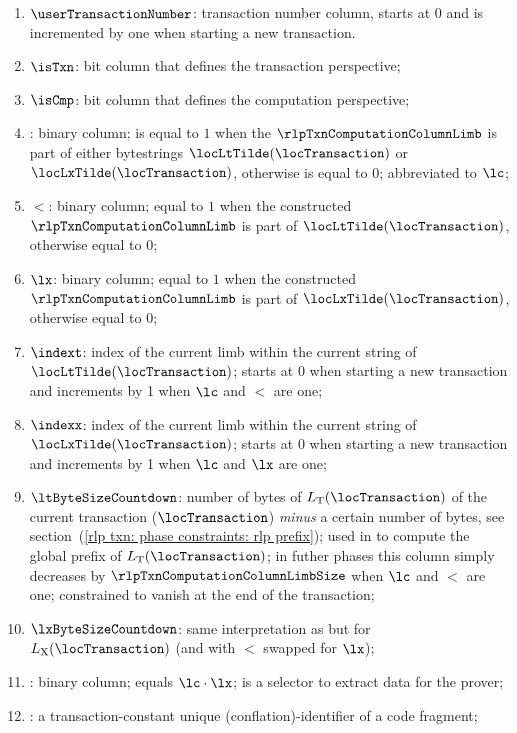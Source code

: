 \begin{enumerate}
    \item $\userTransactionNumber$:
	transaction number column, starts at 0 and is incremented by one when starting a new transaction.
    \item $\isTxn$:
	bit column that defines the transaction perspective;
    \item $\isCmp$:
	bit column that defines the computation perspective;
    \item {}:
	binary column;
	is equal to $1$ when the $\rlpTxnComputationColumnLimb$ is part of either \rlp{} bytestrings $\locLtTilde(\locTransaction)$ or $\locLxTilde(\locTransaction)$, otherwise is equal to $0$;
	abbreviated to $\lc$;
    \item $\lt$:
	binary column; equal to $1$ when the constructed $\rlpTxnComputationColumnLimb$ is part of $\locLtTilde(\locTransaction)$, otherwise equal to $0$;
    \item $\lx$:
	binary column; equal to $1$ when the constructed $\rlpTxnComputationColumnLimb$ is part of $\locLxTilde(\locTransaction)$, otherwise equal to $0$;
    \item $\indext$:
	index of the current limb within the current string of $\locLtTilde(\locTransaction)$;
	starts at $0$ when starting a new transaction and increments by 1 when $\lc$ and $\lt$ are one; 
    \item $\indexx$:                                                       
	index of the current limb within the current string of $\locLxTilde(\locTransaction)$;
	starts at $0$ when starting a new transaction and increments by 1 when $\lc$ and $\lx$ are one;
    \item $\ltByteSizeCountdown$:
	number of bytes of $L_{\mathrm{T}}(\locTransaction)$ of the current transaction ($\locTransaction$) \emph{minus} a certain number of bytes,
	see section~(\ref{rlp txn: phase constraints: rlp prefix});
	used in \phaseRlpPrefix{} to compute the global \rlp{} prefix of $L_{\mathrm{T}}(\locTransaction)$;
	in futher phases this column simply decreases by $\rlpTxnComputationColumnLimbSize$ when $\lc$ and $\lt$ are one;
	constrained to vanish at the end of the transaction;
    \item $\lxByteSizeCountdown$:
	same interpretation as \ltByteSizeCountdown{} but for $L_{\mathrm{X}}(\locTransaction)$
	(and with $\lt$ swapped for $\lx$);
    \item \toHashByProver{}:
	binary column; equals $\lc \cdot \lx$; is a selector to extract data for the prover;
    \item \CFI{}:
	a transaction-constant unique (conflation)-identifier of a code fragment;
\end{enumerate}
